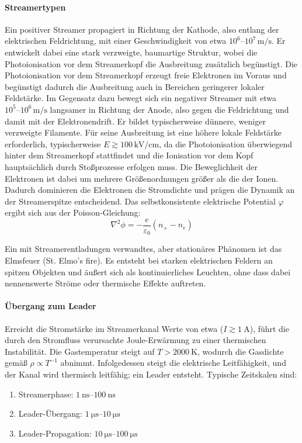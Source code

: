 \paragraph{Streamertypen}
Ein positiver Streamer propagiert in Richtung der Kathode, also entlang der elektrischen Feldrichtung, mit einer Geschwindigkeit von etwa $10^{6}\text{–}10^{7}\,\mathrm{m/s}$. Er entwickelt dabei eine stark verzweigte, baumartige Struktur, wobei die Photoionisation vor dem Streamerkopf die Ausbreitung zusätzlich begünstigt. Die Photoionisation vor dem Streamerkopf erzeugt freie Elektronen im Voraus und begünstigt dadurch die Ausbreitung auch in Bereichen geringerer lokaler Feldstärke.
Im Gegensatz dazu bewegt sich ein negativer Streamer mit etwa $10^{5}\text{–}10^{6}\,\mathrm{m/s}$ langsamer in Richtung der Anode, also gegen die Feldrichtung und damit mit der Elektronendrift. Er bildet typischerweise dünnere, weniger verzweigte Filamente. Für seine Ausbreitung ist eine höhere lokale Feldstärke erforderlich, typischerweise $E \gtrsim 100\,\mathrm{kV/cm}$, da die Photoionisation überwiegend hinter dem Streamerkopf stattfindet und die Ionisation vor dem Kopf hauptsächlich durch Stoßprozesse erfolgen muss.
Die Beweglichkeit der Elektronen ist dabei um mehrere Größenordnungen größer als die der Ionen. Dadurch dominieren die Elektronen die Stromdichte und prägen die Dynamik an der Streamerspitze entscheidend.
Das selbstkonsistente elektrische Potential \(\varphi\) ergibt sich aus der Poisson-Gleichung:
\begin{equation}
    \nabla^2 \phi = -\frac{e}{\varepsilon_0}(n_+ - n_e)
\end{equation}

Ein mit Streamerentladungen verwandtes, aber stationäres Phänomen ist das Elmsfeuer (St. Elmo's fire). Es entsteht bei starken elektrischen Feldern an spitzen Objekten und äußert sich als kontinuierliches Leuchten, ohne dass dabei nennenswerte Ströme oder thermische Effekte auftreten.

\paragraph{Übergang zum Leader}
Erreicht die Stromstärke im Streamerkanal Werte von etwa ($I \gtrsim \SI{1}{\ampere}$), führt die durch den Stromfluss verursachte Joule-Erwärmung zu einer thermischen Instabilität. Die Gastemperatur steigt auf $T > \SI{2000}{\kelvin}$, wodurch die Gasdichte gemäß $\rho \propto T^{-1}$ abnimmt. Infolgedessen steigt die elektrische Leitfähigkeit, und der Kanal wird thermisch leitfähig; ein Leader entsteht. 
Typische Zeitskalen sind: 
\begin{enumerate}
  \item Streamerphase: $\SIrange{1}{100}{\nano\second}$
  \item Leader-Übergang: $\SIrange{1}{10}{\micro\second}$
  \item Leader-Propagation: $\SIrange{10}{100}{\micro\second}$
 
\end{enumerate}

